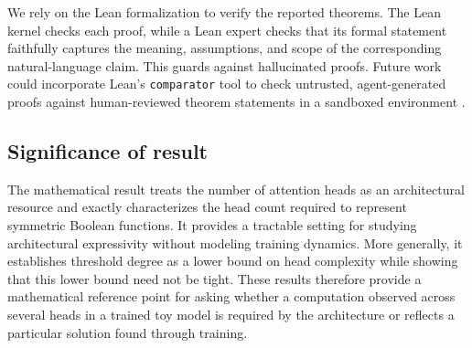 \documentclass{article}
\theoremstyle{definition}
\theoremstyle{plain}
\begin{document}

We rely on the Lean formalization to verify the reported theorems. The Lean kernel checks each proof, while a Lean expert checks that its formal statement faithfully captures the meaning, assumptions, and scope of the corresponding natural-language claim. This guards against hallucinated proofs. Future work could incorporate Lean's \texttt{comparator} tool to check untrusted, agent-generated proofs against human-reviewed theorem statements in a sandboxed environment \citep{leanfro2026comparator}.

\subsection{Significance of result}


%
%

The mathematical result treats the number of attention heads as an architectural resource and exactly characterizes the head count required to represent symmetric Boolean functions. It provides a tractable setting for studying architectural expressivity without modeling training dynamics. More generally, it establishes threshold degree as a lower bound on head complexity while showing that this lower bound need not be tight. These results therefore provide a mathematical reference point for asking whether a computation observed across several heads in a trained toy model is required by the architecture or reflects a particular solution found through training.
\end{document}
